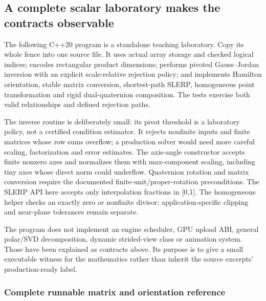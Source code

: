 \subsection{A complete scalar laboratory makes the contracts observable}\label{a-complete-scalar-laboratory-makes-the-contracts-observable}

The following C++20 program is a standalone teaching laboratory. Copy its whole fence into one source file. It uses actual array storage and checked logical indices; encodes rectangular product dimensions; performs pivoted Gauss--Jordan inversion with an explicit scale-relative rejection policy; and implements Hamilton orientation, stable matrix conversion, shortest-path SLERP, homogeneous point transformation and rigid dual-quaternion composition. The tests exercise both valid relationships and defined rejection paths.

The inverse routine is deliberately small: its pivot threshold is a laboratory policy, not a certified condition estimator. It rejects nonfinite inputs and finite matrices whose row sums overflow; a production solver would need more careful scaling, factorization and error estimates. The axis-angle constructor accepts finite nonzero axes and normalizes them with max-component scaling, including tiny axes whose direct norm could underflow. Quaternion rotation and matrix conversion require the documented finite-unit/proper-rotation preconditions. The SLERP API here accepts only interpolation fractions in {[}0,1{]}. The homogeneous helper checks an exactly zero or nonfinite divisor; application-specific clipping and near-plane tolerances remain separate.

The program does not implement an engine scheduler, GPU upload ABI, general polar/SVD decomposition, dynamic strided-view class or animation system. Those have been explained as contracts above. Its purpose is to give a small executable witness for the mathematics rather than inherit the source excerpts' production-ready label.

\subsubsection{Complete runnable matrix and orientation reference}\label{complete-runnable-matrix-and-orientation-reference}

